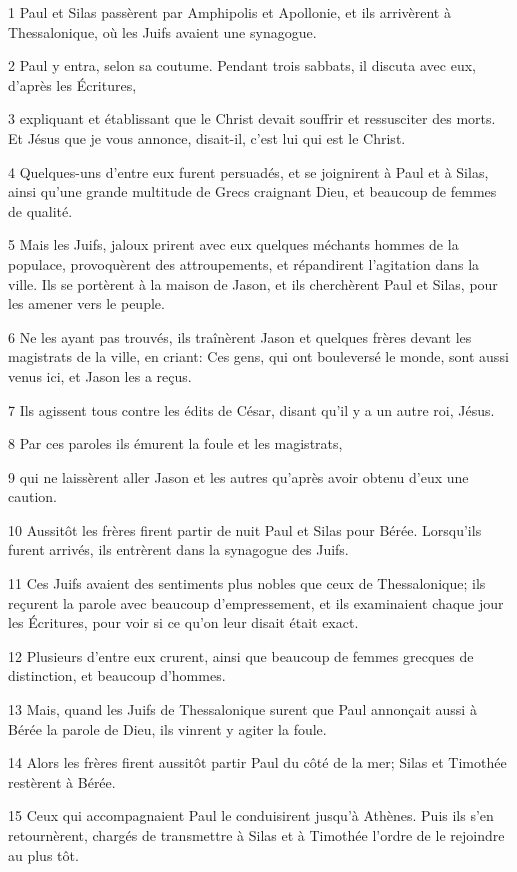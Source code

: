 \par 1 Paul et Silas passèrent par Amphipolis et Apollonie, et ils arrivèrent à Thessalonique, où les Juifs avaient une synagogue.
\par 2 Paul y entra, selon sa coutume. Pendant trois sabbats, il discuta avec eux, d'après les Écritures,
\par 3 expliquant et établissant que le Christ devait souffrir et ressusciter des morts. Et Jésus que je vous annonce, disait-il, c'est lui qui est le Christ.
\par 4 Quelques-uns d'entre eux furent persuadés, et se joignirent à Paul et à Silas, ainsi qu'une grande multitude de Grecs craignant Dieu, et beaucoup de femmes de qualité.
\par 5 Mais les Juifs, jaloux prirent avec eux quelques méchants hommes de la populace, provoquèrent des attroupements, et répandirent l'agitation dans la ville. Ils se portèrent à la maison de Jason, et ils cherchèrent Paul et Silas, pour les amener vers le peuple.
\par 6 Ne les ayant pas trouvés, ils traînèrent Jason et quelques frères devant les magistrats de la ville, en criant: Ces gens, qui ont bouleversé le monde, sont aussi venus ici, et Jason les a reçus.
\par 7 Ils agissent tous contre les édits de César, disant qu'il y a un autre roi, Jésus.
\par 8 Par ces paroles ils émurent la foule et les magistrats,
\par 9 qui ne laissèrent aller Jason et les autres qu'après avoir obtenu d'eux une caution.
\par 10 Aussitôt les frères firent partir de nuit Paul et Silas pour Bérée. Lorsqu'ils furent arrivés, ils entrèrent dans la synagogue des Juifs.
\par 11 Ces Juifs avaient des sentiments plus nobles que ceux de Thessalonique; ils reçurent la parole avec beaucoup d'empressement, et ils examinaient chaque jour les Écritures, pour voir si ce qu'on leur disait était exact.
\par 12 Plusieurs d'entre eux crurent, ainsi que beaucoup de femmes grecques de distinction, et beaucoup d'hommes.
\par 13 Mais, quand les Juifs de Thessalonique surent que Paul annonçait aussi à Bérée la parole de Dieu, ils vinrent y agiter la foule.
\par 14 Alors les frères firent aussitôt partir Paul du côté de la mer; Silas et Timothée restèrent à Bérée.
\par 15 Ceux qui accompagnaient Paul le conduisirent jusqu'à Athènes. Puis ils s'en retournèrent, chargés de transmettre à Silas et à Timothée l'ordre de le rejoindre au plus tôt.
